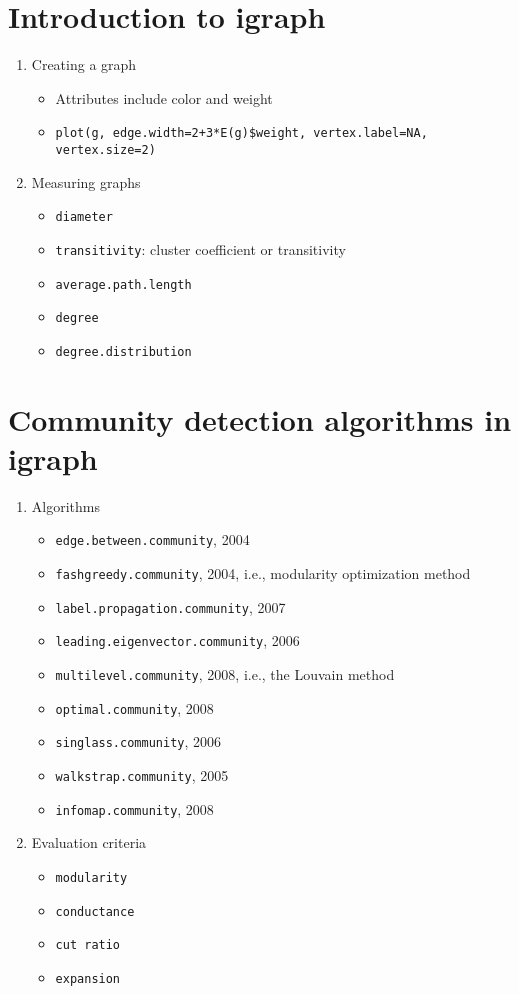 \documentclass[14pt]{article}
\begin{document}
\section{Introduction to igraph}
\begin{enumerate}
 \item Creating a graph
  \begin{itemize}
   \item Attributes include color and weight
   \item \texttt{plot(g, edge.width=2+3*E(g)\$weight, vertex.label=NA, vertex.size=2)}
  \end{itemize}
 \item Measuring graphs
  \begin{itemize}
   \item \texttt{diameter}
   \item \texttt{transitivity}: cluster coefficient or transitivity
   \item \texttt{average.path.length}
   \item \texttt{degree}
   \item \texttt{degree.distribution}
  \end{itemize}
\end{enumerate}

\section{Community detection algorithms in igraph}
\begin{enumerate}
 \item Algorithms 
 \begin{itemize}
  \item \texttt{edge.between.community}, 2004
  \item \texttt{fashgreedy.community}, 2004, i.e., modularity optimization method
  \item \texttt{label.propagation.community}, 2007
  \item \texttt{leading.eigenvector.community}, 2006
  \item \texttt{multilevel.community}, 2008, i.e., the Louvain method
  \item \texttt{optimal.community}, 2008
  \item \texttt{singlass.community}, 2006
  \item \texttt{walkstrap.community}, 2005
  \item \texttt{infomap.community}, 2008
 \end{itemize}
 
 \item Evaluation criteria
  \begin{itemize}
   \item \texttt{modularity}
   \item \texttt{conductance}
   \item \texttt{cut ratio}
   \item \texttt{expansion}
  \end{itemize}
\end{enumerate}
\end{document}
